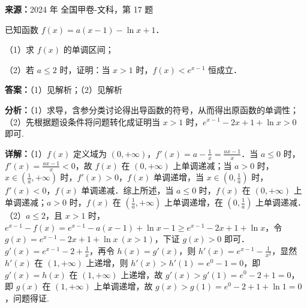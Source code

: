 \begin{question}[points=12]
\textbf{来源：}2024 年 全国甲卷-文科，第 17 题\par
已知函数 $f(x) = a(x-1) - \ln x + 1$．

（1）求 $f(x)$ 的单调区间；

（2）若 $a \le 2$ 时，证明：当 $x > 1$ 时，$f(x) < e^{x-1}$ 恒成立．
\begin{solution}
\textbf{答案：}（1）见解析；（2）见解析

\textbf{分析：}（1）求导，含参分类讨论得出导函数的符号，从而得出原函数的单调性；（2）先根据题设条件将问题转化成证明当 $x > 1$ 时，$e^{x-1} - 2x + 1 + \ln x > 0$ 即可.

\textbf{详解：}（1）$f(x)$ 定义域为 $(0, +\infty)$，$f'(x) = a - \frac{1}{x} = \frac{ax - 1}{x}$．当 $a \le 0$ 时，$f'(x) = \frac{ax - 1}{x} < 0$，故 $f(x)$ 在 $(0, +\infty)$ 上单调递减；当 $a > 0$ 时，$x \in \left(\frac{1}{a}, +\infty\right)$ 时，$f'(x) > 0$，$f(x)$ 单调递增，当 $x \in \left(0, \frac{1}{a}\right)$ 时，$f'(x) < 0$，$f(x)$ 单调递减．综上所述，当 $a \le 0$ 时，$f(x)$ 在 $(0, +\infty)$ 上单调递减；$a > 0$ 时，$f(x)$ 在 $\left(\frac{1}{a}, +\infty\right)$ 上单调递增，在 $\left(0, \frac{1}{a}\right)$ 上单调递减．
（2）$a \le 2$，且 $x > 1$ 时，$e^{x-1} - f(x) = e^{x-1} - a(x-1) + \ln x - 1 \ge e^{x-1} - 2x + 1 + \ln x$，令 $g(x) = e^{x-1} - 2x + 1 + \ln x \ (x > 1)$，下证 $g(x) > 0$ 即可．$g'(x) = e^{x-1} - 2 + \frac{1}{x}$，再令 $h(x) = g'(x)$，则 $h'(x) = e^{x-1} - \frac{1}{x^2}$，显然 $h'(x)$ 在 $(1, +\infty)$ 上递增，则 $h'(x) > h'(1) = e^0 - 1 = 0$，即 $g'(x) = h(x)$ 在 $(1, +\infty)$ 上递增，故 $g'(x) > g'(1) = e^0 - 2 + 1 = 0$，即 $g(x)$ 在 $(1, +\infty)$ 上单调递增，故 $g(x) > g(1) = e^0 - 2 + 1 + \ln 1 = 0$，问题得证.
\end{solution}
\end{question}

